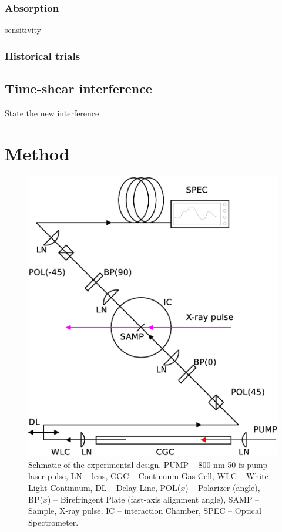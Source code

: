 \documentclass{article}
\newlength{\figwidth}
\begin{document}
\subsubsection{Absorption}
	sensitivity
\subsubsection{Historical trials}

\subsection{Time-shear interference}
State the new interference

\section{Method}
\begin{figure}
\centerline{\includegraphics[width=.5\figwidth]{Scheme_diagram.eps}}
\caption{\label{fig::cartoon} Schmatic of the experimental design. 
PUMP -- 800 nm 50 fs pump laser pulse,
LN -- lens, 
CGC -- Continuum Gas Cell, 
WLC -- White Light Continuum, 
DL -- Delay Line, 
POL($x$) -- Polarizer (angle), 
BP($x$) -- Birefringent Plate (fast-axis alignment angle), 
SAMP -- Sample, 
X-ray pulse, 
IC -- interaction Chamber, 
SPEC -- Optical Spectrometer.
}
\end{figure}
\end{document}
